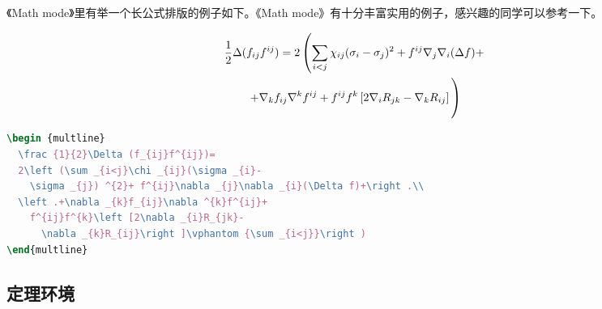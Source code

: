 《Math mode》里有举一个长公式排版的例子如下。《Math mode》有十分丰富实用的例子，感兴趣的同学可以参考一下。

\begin {multline}
  \frac {1}{2}\Delta (f_{ij}f^{ij})=
  2\left (\sum _{i<j}\chi _{ij}(\sigma _{i}-
    \sigma _{j}) ^{2}+ f^{ij}\nabla _{j}\nabla _{i}(\Delta f)+\right .\\
  \left .+\nabla _{k}f_{ij}\nabla ^{k}f^{ij}+
    f^{ij}f^{k}\left [2\nabla _{i}R_{jk}-
      \nabla _{k}R_{ij}\right ]\vphantom {\sum _{i<j}}\right )
\end{multline}

\begin{lstlisting}[language={TeX}, caption={长公式排版}]
\begin {multline}
  \frac {1}{2}\Delta (f_{ij}f^{ij})=
  2\left (\sum _{i<j}\chi _{ij}(\sigma _{i}-
    \sigma _{j}) ^{2}+ f^{ij}\nabla _{j}\nabla _{i}(\Delta f)+\right .\\
  \left .+\nabla _{k}f_{ij}\nabla ^{k}f^{ij}+
    f^{ij}f^{k}\left [2\nabla _{i}R_{jk}-
      \nabla _{k}R_{ij}\right ]\vphantom {\sum _{i<j}}\right )
\end{multline}
\end{lstlisting}

\subsection{定理环境}


